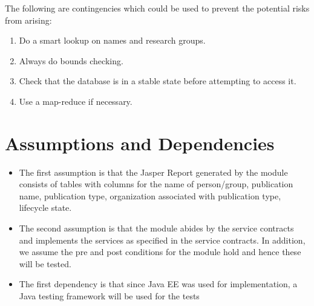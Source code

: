 	The following are contingencies which could be used to prevent the potential risks from arising:
\begin{enumerate}

	\item Do a smart lookup on names and research groups.
	\item Always do bounds checking.
	\item Check that the database is in a stable state before attempting to access it.
	\item Use a map-reduce if necessary.
         

\end{enumerate} 

\section{Assumptions and Dependencies}
\label{assumptions}
\begin{itemize}
	\item The first assumption is that the Jasper Report generated by the module consists of tables with columns for the name of person/group, publication name, publication type, organization associated with publication type, lifecycle state.
	\item The second assumption is that the module abides by the service contracts and implements the services as specified in the service contracts. In addition, we assume the pre and post conditions for the module hold and hence these will be tested.
	\item The first dependency is that since Java EE was used for implementation, a Java testing framework will be used for the tests
\end{itemize}
